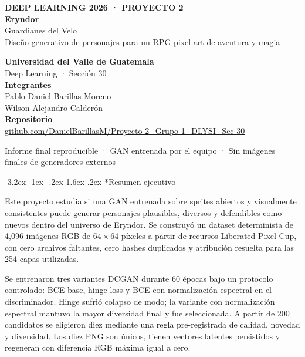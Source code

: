 \documentclass[11pt]{article}
\makeatletter
\renewcommand\section{\@startsection{section}{1}{\z@}%
  {-3.2ex \@plus -1ex \@minus -.2ex}%
  {1.6ex \@plus .2ex}%
  {\normalfont\Large\bfseries\color{DeepPurple}}}
\makeatother
\begin{document}
\begin{titlepage}
\pagecolor{Obsidian}
\color{white}
\vspace*{0.65in}
{\small\bfseries\color{MineralCyan}\MakeUppercase{Deep Learning 2026 · Proyecto 2}}\\[0.35in]
{\fontsize{34}{38}\selectfont\bfseries Eryndor}\\[0.08in]
{\fontsize{25}{30}\selectfont Guardianes del Velo}\\[0.28in]
{\large\color{Lavender}Diseño generativo de personajes para un RPG pixel art de aventura y magia}

\vfill
\colorbox{DeepPurple}{\parbox[c][1.65in][c]{0.91\textwidth}{\hspace{0.28in}\begin{minipage}{0.83\textwidth}
\textbf{Universidad del Valle de Guatemala}\\
Deep Learning · Sección 30\\[0.16in]
\textbf{Integrantes}\\
Pablo Daniel Barillas Moreno\\
Wilson Alejandro Calderón\\[0.16in]
\textbf{Repositorio}\\
\href{https://github.com/DanielBarillasM/Proyecto-2_Grupo-1_DLYSI_Sec-30.git}{github.com/DanielBarillasM/Proyecto-2\_Grupo-1\_DLYSI\_Sec-30}
\end{minipage}}}

\vfill
{\small\color{Lavender}Informe final reproducible · GAN entrenada por el equipo · Sin imágenes finales de generadores externos}
\end{titlepage}
\nopagecolor
\color{Ink}

\section*{Resumen ejecutivo}

Este proyecto estudia si una GAN entrenada sobre sprites abiertos y visualmente consistentes puede generar personajes plausibles, diversos y defendibles como nuevos dentro del universo de Eryndor. Se construyó un dataset determinista de 4,096 imágenes RGB de $64\times64$ píxeles a partir de recursos Liberated Pixel Cup, con cero archivos faltantes, cero hashes duplicados y atribución resuelta para las 254 capas utilizadas.

Se entrenaron tres variantes DCGAN durante 60 épocas bajo un protocolo controlado: BCE base, hinge loss y BCE con normalización espectral en el discriminador. Hinge sufrió colapso de modo; la variante con normalización espectral mantuvo la mayor diversidad final y fue seleccionada. A partir de 200 candidatos se eligieron diez mediante una regla pre-registrada de calidad, novedad y diversidad. Los diez PNG son únicos, tienen vectores latentes persistidos y regeneran con diferencia RGB máxima igual a cero.
\end{document}
